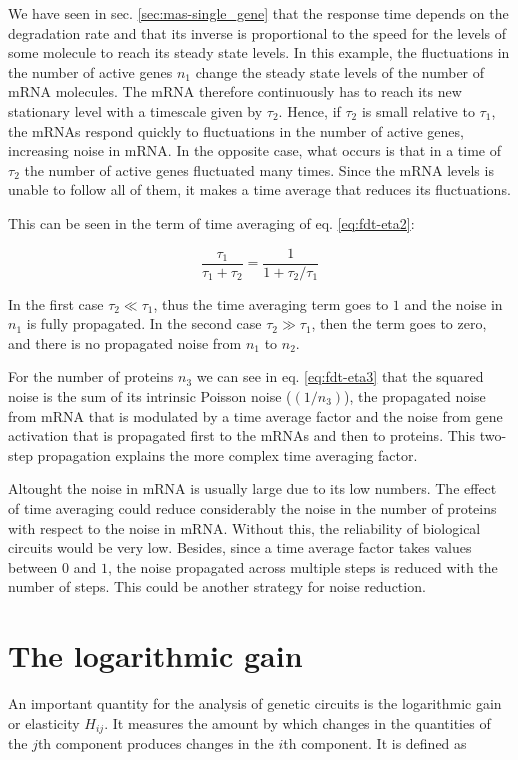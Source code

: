  We have seen in sec. \ref{sec:mas-single_gene} that the response time depends on the degradation rate and that its inverse is proportional to the speed for the levels of some molecule to reach its steady state levels. In this example, the fluctuations in the number of active genes $n_1$ change the steady state levels of the number of mRNA molecules. The mRNA therefore continuously has to reach its new stationary level with a timescale given by $\tau_2$. Hence, if $\tau_2$ is small relative to $\tau_1$, the mRNAs respond quickly to fluctuations in the number of active genes, increasing noise in mRNA. In the opposite case, what occurs is that in a time of $\tau_2$ the number of active genes fluctuated many times. Since the mRNA levels is unable to follow all of them, it makes a time average that reduces its fluctuations.

This can be seen in the term of time averaging of eq. \eqref{eq:fdt-eta2}:

\begin{equation*}
  \frac{\tau_1}{\tau_1+\tau_2} = \frac{1}{1+\tau_2/\tau_1}
\end{equation*}

In the first case $\tau_2\ll\tau_1$, thus the time averaging term goes to $1$ and the noise in $n_1$ is fully propagated. In the second case $\tau_2\gg\tau_1$, then the term goes to zero, and there is no propagated noise from $n_1$ to $n_2$.

For the number of proteins $n_3$ we can see in eq. \eqref{eq:fdt-eta3} that the squared noise is the sum of its intrinsic Poisson noise ($(1/n_3)$), the propagated noise from mRNA that is modulated by a time average factor and the noise from gene activation that is propagated first to the mRNAs and then to proteins. This two-step propagation explains the more complex time averaging factor.

Altought the noise in mRNA is usually large due to its low numbers. The effect of time averaging could reduce considerably the noise in the number of proteins with respect to the noise in mRNA. Without this, the reliability of biological circuits would be very low. Besides, since a time average factor takes values between $0$ and $1$, the noise propagated across multiple steps is reduced with the number of steps. This could be another strategy for noise reduction.

\section{The logarithmic gain}
\label{sec:log_gain}
An important quantity for the analysis of genetic circuits is the logarithmic gain or elasticity $H_{ij}$. It measures the amount by which changes in the quantities of the $j$th component produces changes in the $i$th component. It is defined as

